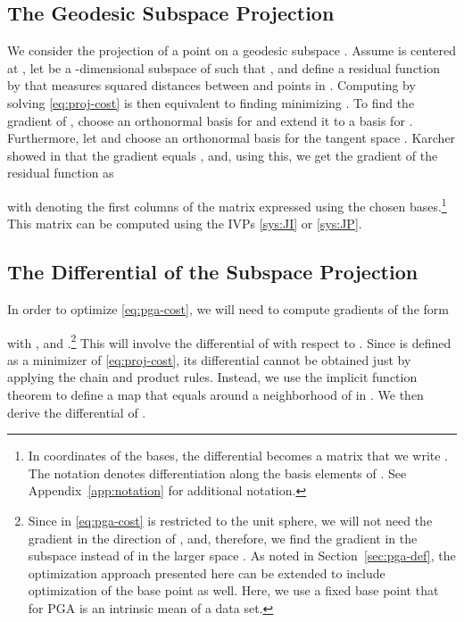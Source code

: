 \documentclass[final]{svjour3}
\begin{document}
\subsection{The Geodesic Subspace Projection}
We consider the projection  of a point  on a geodesic subspace . Assume  is centered at , 
let  be a -dimensional subspace of 
such that , and define a residual function  
by  that measures squared distances between  and points
in . Computing  by solving \eqref{eq:proj-cost} is then equivalent to
finding  minimizing . To find the gradient of , 
choose an orthonormal basis for  
and extend it to a basis for . Furthermore, let
 and choose an orthonormal basis for the tangent space . 
Karcher showed in \cite{karcher_riemannian_1977} that the gradient
 equals , and, using this, we get the gradient of the
residual function as

with  denoting the first  columns of
the matrix  expressed using the chosen bases.\footnote{In
coordinates of the bases, the differential  becomes a matrix
that we write .
The notation  denotes differentiation along the basis
elements of . See Appendix~\ref{app:notation} for additional notation.}
This matrix can be computed using the IVPs \eqref{sys:JI} or \eqref{sys:JP}.

\subsection{The Differential of the Subspace Projection}
\label{sec:grad-proj}
In order to optimize \eqref{eq:pga-cost}, we will need to compute gradients of
the form

with ,  and .\footnote{
Since  in \eqref{eq:pga-cost} is restricted to the unit sphere, we will not
need the gradient in the direction of , and, therefore, we find the gradient
in the subspace  instead of in the larger space
.
As noted in Section~\ref{sec:pga-def}, the optimization approach presented here can be extended to
include optimization of the base point  as well. Here, we use a fixed base
point that for PGA is an intrinsic mean of a data set.
}
This will involve the differential of  with respect to . 
Since  is defined as a minimizer of \eqref{eq:proj-cost}, 
its differential cannot be obtained just by applying the chain and product rules.
Instead, we use the implicit function theorem to define a map  that equals 
 around a neighborhood of  in . We then derive the
differential of .
\end{document}

